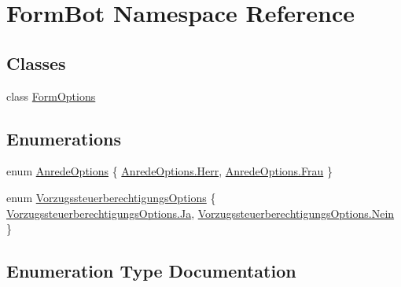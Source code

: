 \hypertarget{namespace_form_bot}{}\section{Form\+Bot Namespace Reference}
\label{namespace_form_bot}
\subsection*{Classes}
\begin{DoxyCompactItemize}
\item 
class \hyperlink{class_form_bot_1_1_form_options}{Form\+Options}
\end{DoxyCompactItemize}
\subsection*{Enumerations}
\begin{DoxyCompactItemize}
\item 
enum \hyperlink{namespace_form_bot_aaabee8bca7b8f1dc2a8ff3e380a363a8}{Anrede\+Options} \{ \hyperlink{namespace_form_bot_aaabee8bca7b8f1dc2a8ff3e380a363a8a5637d9b9874593c673287800f6944194}{Anrede\+Options.\+Herr}, 
\hyperlink{namespace_form_bot_aaabee8bca7b8f1dc2a8ff3e380a363a8a86dd3534fc5d36a81e6b25ef2eef9c52}{Anrede\+Options.\+Frau}
 \}
\item 
enum \hyperlink{namespace_form_bot_aebf15a36725c2ee1db3018b157253939}{Vorzugssteuerberechtigungs\+Options} \{ \hyperlink{namespace_form_bot_aebf15a36725c2ee1db3018b157253939a375ee26098b46e23bcb854331f0ad8c5}{Vorzugssteuerberechtigungs\+Options.\+Ja}, 
\hyperlink{namespace_form_bot_aebf15a36725c2ee1db3018b157253939ab397ec0bea79fb90df2b7ec2845cde07}{Vorzugssteuerberechtigungs\+Options.\+Nein}
 \}
\end{DoxyCompactItemize}


\subsection{Enumeration Type Documentation}
